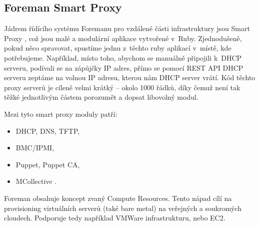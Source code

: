 \subsection{Foreman Smart Proxy}

Jádrem řídícího systému Foremanu pro vzdálené části infrastruktury jsou Smart Proxy \cite{foreman-proxy}, což jsou malé a modulární aplikace vytvořené v~Ruby. Zjednodušeně, pokud něco spravovat, spustíme jednu z~těchto ruby aplikací v~místě, kde potřebujeme. Například, místo toho, abychom se manuálně připojili k~DHCP serveru, podívali se na zápůjčky IP adres, přímo se pomocí REST API DHCP serveru zeptáme na volnou IP adresu, kterou nám DHCP server vrátí. Kód těchto proxy serverů je cíleně velmi krátký -- okolo 1000 řádků, díky čemuž není tak těžké jednotlivým částem porozumět a dopsat libovolný modul.

Mezi tyto smart proxy moduly patří:
\begin{itemize}

\item DHCP, DNS, TFTP,
\item BMC/IPMI,
\item Puppet, Puppet CA,
\item MCollective \cite{mcollective}.
\end{itemize}

Foreman obsahuje koncept zvaný Compute Resources. Tento nápad cílí na provisioning virtuálních serverů (také bare metal) na veřejných a soukromých cloudech. Podporuje tedy například VMWare infrastrukturu, nebo EC2.







